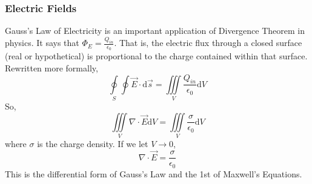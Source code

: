 \subsubsection{Electric Fields}
\noindent
Gauss's Law of Electricity is an important application of Divergence Theorem in physics. It says that $\Phi_{E} = \frac{Q_{in}}{\epsilon_{0}}$. That is, the electric flux through a closed surface (real or hypothetical) is proportional to the charge contained within that surface. Rewritten more formally, 
\begin{equation*}
	\oint\limits_{S}\oint{\vec{E} \cdot \mathrm{d}\vec{s}} = \iiint\limits_{V}{\frac{Q_{in}}{\epsilon_{0}}\mathrm{d}V}	
\end{equation*}
So, 
\begin{equation*}
	\iiint\limits_{V}{\nabla\cdot\vec{E}\mathrm{d}V} = \iiint\limits_{V}{\frac{\sigma}{\epsilon_{0}}\mathrm{d}V}	
\end{equation*}
where $\sigma$ is the charge density.
If we let $V \to 0$, 
\begin{equation*}
	\nabla \cdot \vec{E} = \frac{\sigma}{\epsilon_{0}}
\end{equation*}
This is the differential form of Gauss's Law and the 1st of Maxwell's Equations.